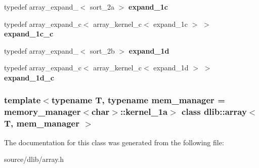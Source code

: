 \begin{DoxyCompactItemize}
\item 
\hypertarget{classdlib_1_1array_a6bca4760c81d9ab9bae6d0cfb2b982e6}{
typedef array\_\-expand\_$<$ sort\_\-2a $>$ {\bfseries expand\_\-1c}}
\label{classdlib_1_1array_a6bca4760c81d9ab9bae6d0cfb2b982e6}

\item 
\hypertarget{classdlib_1_1array_a9b0cd9262892e1af7da5f3729d3bd10e}{
typedef array\_\-expand\_\-c$<$ array\_\-kernel\_\-c$<$ expand\_\-1c $>$ $>$ {\bfseries expand\_\-1c\_\-c}}
\label{classdlib_1_1array_a9b0cd9262892e1af7da5f3729d3bd10e}

\item 
\hypertarget{classdlib_1_1array_a3861701cab061706f223102d86d15f49}{
typedef array\_\-expand\_$<$ sort\_\-2b $>$ {\bfseries expand\_\-1d}}
\label{classdlib_1_1array_a3861701cab061706f223102d86d15f49}

\item 
\hypertarget{classdlib_1_1array_a9ab175ddbb854eed876e3a45d903fca9}{
typedef array\_\-expand\_\-c$<$ array\_\-kernel\_\-c$<$ expand\_\-1d $>$ $>$ {\bfseries expand\_\-1d\_\-c}}
\label{classdlib_1_1array_a9ab175ddbb854eed876e3a45d903fca9}

\end{DoxyCompactItemize}
\subsubsection*{template$<$typename T, typename mem\_\-manager = memory\_\-manager$<$char$>$::kernel\_\-1a$>$ class dlib::array$<$ T, mem\_\-manager $>$}



The documentation for this class was generated from the following file:\begin{DoxyCompactItemize}
\item 
source/dlib/array.h\end{DoxyCompactItemize}
